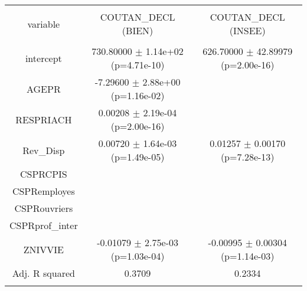 \documentclass{article}
\begin{document}
\begin{table}[!htbp] \centering 
  \caption{} 
  \label{} 
\begin{tabular}{@{\extracolsep{5pt}} ccc} 
\\[-1.8ex]\hline 
\hline \\[-1.8ex] 
variable & COUTAN\_DECL (BIEN) & COUTAN\_DECL (INSEE) \\ 
\hline \\[-1.8ex] 
intercept & 730.80000 $\pm$ 1.14e+02 (p=4.71e-10) & 626.70000 $\pm$ 42.89979 (p=2.00e-16) \\ 
AGEPR &  -7.29600 $\pm$ 2.88e+00 (p=1.16e-02) &  \\ 
RESPRIACH &   0.00208 $\pm$ 2.19e-04 (p=2.00e-16) &  \\ 
Rev\_Disp &   0.00720 $\pm$ 1.64e-03 (p=1.49e-05) &   0.01257 $\pm$  0.00170 (p=7.28e-13) \\ 
CSPRCPIS &  &  \\ 
CSPRemployes &  &  \\ 
CSPRouvriers &  &  \\ 
CSPRprof\_inter &  &  \\ 
ZNIVVIE &  -0.01079 $\pm$ 2.75e-03 (p=1.03e-04) &  -0.00995 $\pm$  0.00304 (p=1.14e-03) \\ 
Adj. R squared & 0.3709 & 0.2334 \\ 
\hline \\[-1.8ex] 
\end{tabular} 
\end{table} 
\end{document}
